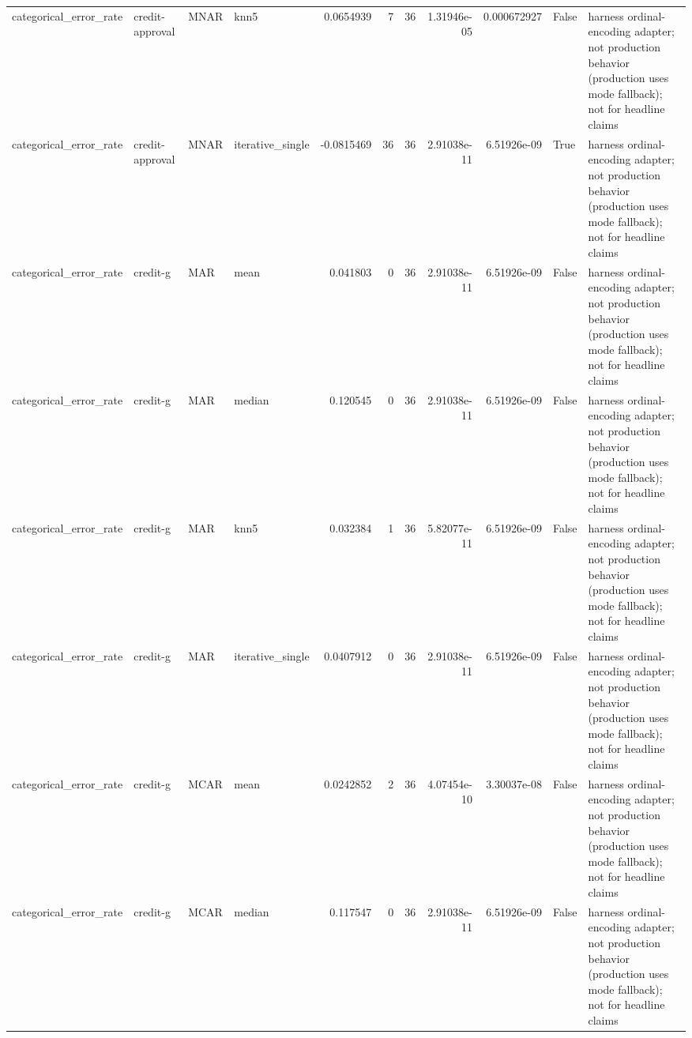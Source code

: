 \begin{table}[ht]
\begin{tabular}{llllrrrrrll}
 categorical\_error\_rate & credit-approval      & MNAR        & knn5             &      0.0654939   &                   7 &      36 & 1.31946e-05 & 0.000672927 & False              & harness ordinal-encoding adapter; not production behavior (production uses mode fallback); not for headline claims \\
 categorical\_error\_rate & credit-approval      & MNAR        & iterative\_single &     -0.0815469   &                  36 &      36 & 2.91038e-11 & 6.51926e-09 & True               & harness ordinal-encoding adapter; not production behavior (production uses mode fallback); not for headline claims \\
 categorical\_error\_rate & credit-g             & MAR         & mean             &      0.041803    &                   0 &      36 & 2.91038e-11 & 6.51926e-09 & False              & harness ordinal-encoding adapter; not production behavior (production uses mode fallback); not for headline claims \\
 categorical\_error\_rate & credit-g             & MAR         & median           &      0.120545    &                   0 &      36 & 2.91038e-11 & 6.51926e-09 & False              & harness ordinal-encoding adapter; not production behavior (production uses mode fallback); not for headline claims \\
 categorical\_error\_rate & credit-g             & MAR         & knn5             &      0.032384    &                   1 &      36 & 5.82077e-11 & 6.51926e-09 & False              & harness ordinal-encoding adapter; not production behavior (production uses mode fallback); not for headline claims \\
 categorical\_error\_rate & credit-g             & MAR         & iterative\_single &      0.0407912   &                   0 &      36 & 2.91038e-11 & 6.51926e-09 & False              & harness ordinal-encoding adapter; not production behavior (production uses mode fallback); not for headline claims \\
 categorical\_error\_rate & credit-g             & MCAR        & mean             &      0.0242852   &                   2 &      36 & 4.07454e-10 & 3.30037e-08 & False              & harness ordinal-encoding adapter; not production behavior (production uses mode fallback); not for headline claims \\
 categorical\_error\_rate & credit-g             & MCAR        & median           &      0.117547    &                   0 &      36 & 2.91038e-11 & 6.51926e-09 & False              & harness ordinal-encoding adapter; not production behavior (production uses mode fallback); not for headline claims \\

\end{tabular}
\end{table}
